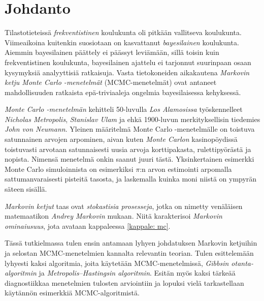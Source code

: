 \chapter{Johdanto}\label{johd}

Tilastotieteissä \textit{frekventistinen} koulukunta oli pitkään vallitseva koulukunta. Viimeaikoina kuitenkin suosiotaan on kasvattanut \emph{bayesilainen} koulukunta. Aiemmin bayesilainen päättely ei päässyt leviämään, sillä toisin kuin frekventistinen koulukunta, bayesilainen ajattelu ei tarjonnut suurinpaan osaan kysymyksiä analyyttisiä ratkaisuja. Vasta tietokoneiden aikakautena \textit{Markovin ketju Monte Carlo -menetelmät} (MCMC-menetelmät) ovat antaneet mahdollisuuden ratkaista epä-triviaaleja ongelmia bayesilaisessa kehyksessä.

\emph{Monte Carlo -menetelmän} kehitteli 50-luvulla \textit{Los Alamosissa} työskennelleet \textit{Nicholas Metropolis}, \textit{Stanislav Ulam} ja ehkä 1900-luvun merkityksellisin tiedemies \textit{John von Neumann}. Yleinen määritelmä Monte Carlo -menetelmälle on toistuva satunnainen arvojen arpominen, aivan kuten \emph{Monte Carlon} kasinopöydissä toistuvasti arvotaan satunnaisesti uusia arvoja korttipakasta, rulettipyörästä ja nopista. Nimensä menetelmä onkin saanut juuri tästä. Yksinkertainen esimerkki Monte Carlo simuloinnista on esimerkiksi $\pi$:n arvon estimointi arpomalla sattumanvaraisesti pisteitä tasosta, ja laskemalla kuinka moni niistä on ympyrän säteen sisällä. 

\textit{Markovin ketjut} taas ovat \textit{stokastisia prosesseja}, jotka on nimetty venäläisen matemaatikon \textit{Andrey Markovin} mukaan. Niitä karakterisoi \emph{Markovin ominaiusuus}, jota avataan kappaleessa \ref{kappale: mc}.

Tässä tutkielmassa tulen ensin antamaan lyhyen johdatuksen Markovin ketjuihin ja selostan MCMC-menetelmien kannalta relevantin teorian. Tulen esittelemään lyhyesti kaksi algoritmia, joita käytetään MCMC-menetelmissä, \textit{Gibbsin otanta-algoritmin} ja \textit{Metropolis–Hastingsin algoritmin}. Esitän myös kaksi tärkeää diagnostiikkaa menetelmien tulosten arviointiin ja lopuksi vielä tarkastellaan käytännön esimerkkiä MCMC-algoritmistä.
